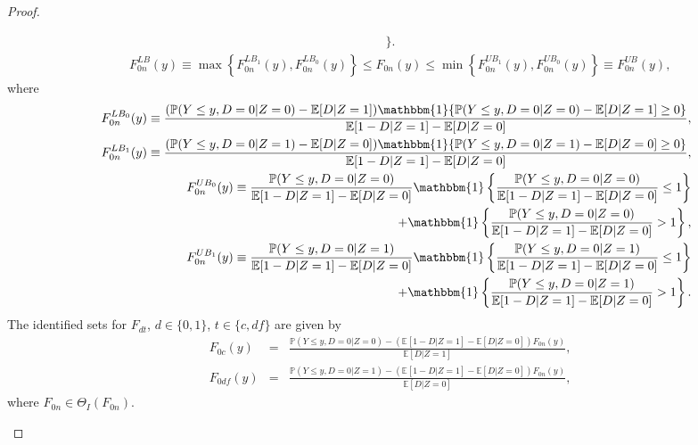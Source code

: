 \documentclass[12pt]{article}
\theoremstyle{plain}
\theoremstyle{definition}
\theoremstyle{remark}
\begin{document}
\begin{proof}
\begin{enumerate}
\begin{eqnarray}
   \Bigg\}.\nonumber
    \end{eqnarray}
\begin{eqnarray*}
   &&F_{0n}^{LB}(y)\equiv \max\left\{F_{0n}^{LB_1}(y),F_{0n}^{LB_0}(y)\right\} \leq F_{0n}(y) \leq \min\left\{F_{0n}^{UB_1}(y),F_{0n}^{UB_0}(y)\right\}\equiv F_{0n}^{UB}(y),
\end{eqnarray*}
where
\begin{eqnarray*}
    && F_{0n}^{LB_0}(y) \equiv \frac{(\mathbb P(Y\leq y, D=0 \vert Z=0)- \mathbb E[D\vert Z=1])\mathbbm{1}\{\mathbb P(Y \leq y, D=0 \vert Z=0)- \mathbb E[D\vert Z=1]\geq 0\}}{\mathbb E[1-D\vert Z=1]-\mathbb E[D\vert Z=0]},\\
   && F_{0n}^{LB_1}(y) \equiv \frac{(\mathbb P(Y\leq y, D=0 \vert Z=1)- \mathbb E[D\vert Z=0])\mathbbm{1}\{\mathbb P(Y\leq y, D=0 \vert Z=1)- \mathbb E[D\vert Z=0]\geq 0\}}{\mathbb E[1-D\vert Z=1]-\mathbb E[D\vert Z=0]},\\
   && F_{0n}^{UB_0}(y) \equiv \frac{\mathbb P(Y \leq y, D=0 \vert Z=0)}{\mathbb E[1-D\vert Z=1]-\mathbb E[D\vert Z=0]}\mathbbm{1}\left\{\frac{\mathbb P(Y \leq y, D=0 \vert Z=0)}{\mathbb E[1-D\vert Z=1]-\mathbb E[D\vert Z=0]} \leq 1\right\}\\
   && + \mathbbm{1}\left\{\frac{\mathbb P(Y \leq y, D=0 \vert Z=0)}{\mathbb E[1-D\vert Z=1]-\mathbb E[D\vert Z=0]} > 1\right\},\\
   && F_{0n}^{UB_1}(y) \equiv \frac{\mathbb P(Y \leq y, D=0 \vert Z=1)}{\mathbb E[1-D\vert Z=1]-\mathbb E[D\vert Z=0]}\mathbbm{1}\left\{\frac{\mathbb P(Y\leq y, D=0 \vert Z=1)}{\mathbb E[1-D\vert Z=1]-\mathbb E[D\vert Z=0]} \leq 1\right\}\\
   && + \mathbbm{1}\left\{\frac{\mathbb P(Y\leq y, D=0 \vert Z=1)}{\mathbb E[1-D\vert Z=1]-\mathbb E[D\vert Z=0]} > 1\right\}.
    \end{eqnarray*}
The identified sets for $F_{dt}$, $d\in\{0,1\}$, $t\in \{c,df\}$ are given by
  \begin{eqnarray*}
    F_{0c}(y) &=& \frac{\mathbb P(Y \leq y, D=0 \vert Z=0)-(\mathbb E[1-D\vert Z=1]-\mathbb E[D\vert Z=0]) F_{0n}(y)}{\mathbb E[D\vert Z=1]},\\
    F_{0df}(y) &=& \frac{\mathbb P(Y \leq y, D=0 \vert Z=1)-(\mathbb E[1-D\vert Z=1]-\mathbb E[D\vert Z=0]) F_{0n}(y)}{\mathbb E[D\vert Z=0]},
  \end{eqnarray*}  
where $F_{0n} \in \Theta_I(F_{0n})$. 


\end{enumerate}
\end{proof}
\end{document}
